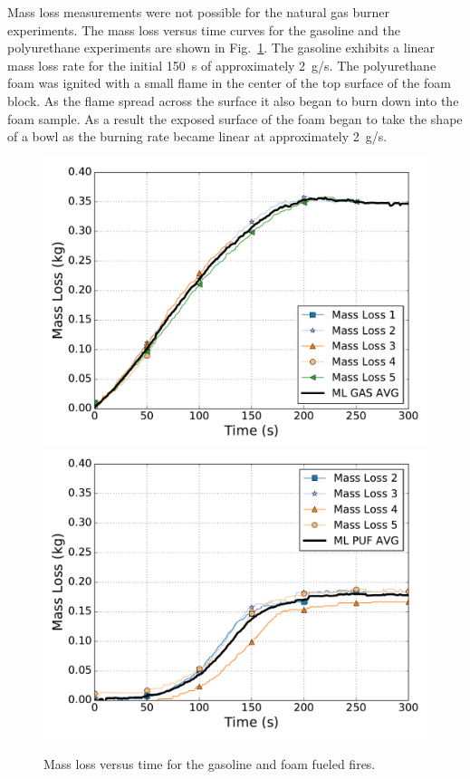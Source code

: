 \documentclass[twoside]{uocthesis}
\begin{document}
{Mass loss measurements were not possible for the natural gas burner experiments.  The mass loss versus time curves for the gasoline and the polyurethane experiments are shown in Fig.~\ref{Mass}.  The gasoline exhibits a linear mass loss rate for the initial 150~s of approximately 2~g/s.  The polyurethane foam was ignited with a small flame in the center of the top surface of the foam block.  As the flame spread across the surface it also began to burn down into the foam sample.  As a result the exposed surface of the foam began to take the shape of a bowl as the burning rate became linear at approximately 2~g/s.

\begin{figure}[p]
  \centering
  \includegraphics[width=4.5in]{../Figures/ML_GAS}\\
  \includegraphics[width=4.5in]{../Figures/ML_PUF}\\
  \caption[Mass loss versus time for the gasoline and foam fueled fires]{Mass loss versus time for the gasoline and foam fueled fires.}
  \label{Mass}
\end{figure}


}
\end{document}
